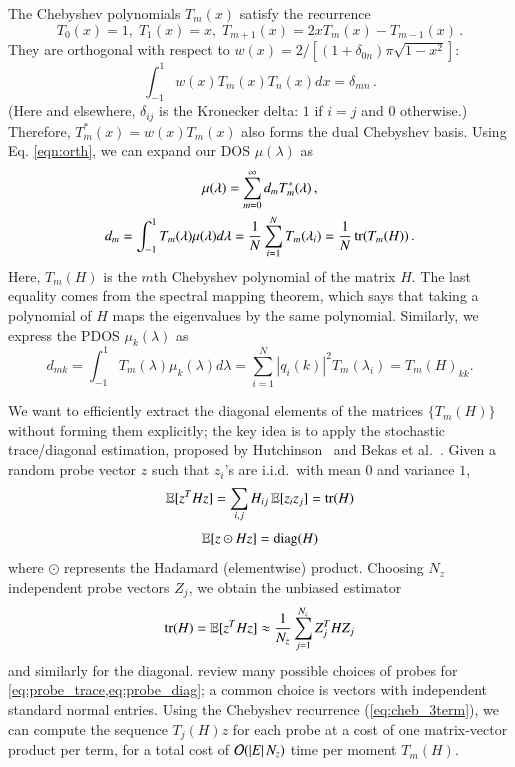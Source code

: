 The Chebyshev polynomials $T_m(x)$ satisfy the recurrence
\begin{equation}\label{eq:cheb_3term}
	T_0(x) = 1,\; T_1(x) = x,\; T_{m+1}(x) = 2xT_m(x) - T_{m-1}(x)\,.
\end{equation}
They are orthogonal with respect to $w(x) =  2 / \left[(1+\delta_{0n})\pi
\sqrt{1-x^2}\right]$:
\begin{equation} \label{eqn:orth}
	\int_{-1}^1 w(x)T_m(x)T_n(x)dx = \delta_{mn}\,.
\end{equation}
(Here and elsewhere, $\delta_{ij}$ is the Kronecker delta: $1$ if $i = j$ and
$0$ otherwise.) Therefore, $T_m^\ast(x) = w(x)T_m(x)$ also forms the dual
Chebyshev basis. Using Eq. \ref{eqn:orth}, we can expand our DOS $\mu(\lambda)$
as
\begin{gather} \label{eqn:doscoeff}
\mu(\lambda) = \sum_{m=0}^\infty d_mT^\ast_m(\lambda)\,, \\
d_m = \int_{-1}^1T_m(\lambda)\mu(\lambda)d\lambda = \frac{1}{N}\sum_{i=1}^N 
T_m(\lambda_i) = \frac{1}{N}\operatorname{tr}(T_m(H))\,.
\end{gather}
Here, $T_m(H)$ is the $m$th Chebyshev polynomial of the matrix $H$. The last
equality comes from the spectral mapping theorem, which says that taking a
polynomial of $H$ maps the eigenvalues by the same polynomial. Similarly, we
express the PDOS $\mu_k(\lambda)$ as \begin{equation}\label{eqn:pdoscoeff}
d_{mk} = \int_{-1}^1 T_m(\lambda)\mu_k(\lambda)d\lambda = \sum_{i=1}^N |q_i(k)|
^2T_m(\lambda_i) = T_m(H)_{kk}.
\end{equation}

We want to efficiently extract the diagonal elements of the matrices $\{T_m
(H)\}$ without forming them explicitly; the key idea is to apply the stochastic
trace/diagonal estimation, proposed by Hutchinson~
\cite{hutchinson1990stochastic} and Bekas et al.~\cite{bekas2007estimator}.
Given a random probe vector $z$ such that $z_i$'s are i.i.d.~with mean $0$ and
variance $1$,
\begin{equation}\label{eq:probe_trace}
	\operatorname{\mathbb{E}}[z^THz] = \sum_{i,j}H_{ij}\operatorname{\mathbb{E}}[z_iz_j] = \operatorname{tr}(H)
\end{equation}
\begin{equation}\label{eq:probe_diag}
	\operatorname{\mathbb{E}}[z\odot Hz] = \operatorname{diag}(H)
\end{equation}
where $\odot$ represents the Hadamard (elementwise) product. Choosing $N_z$
independent probe vectors $Z_j$, we obtain the unbiased estimator
\begin{equation}
	\operatorname{tr}(H) = \operatorname{\mathbb{E}}[z^THz] \approx \frac{1}{N_z}\sum_{j=1}^{N_z}Z_j^THZ_j 
\end{equation}
and similarly for the diagonal. \citet{avron2011randomized} review many possible
choices of probes for \cref{eq:probe_trace,eq:probe_diag}; a common choice is
vectors with independent standard normal entries. Using the Chebyshev recurrence
(\cref{eq:cheb_3term}), we can compute the sequence $T_j(H)z$ for each probe at
a cost of one matrix-vector product per term, for a total cost of $\mathcal{O}(
\left\lvert E\right\rvert N_z)$ time per moment $T_m(H)$.

